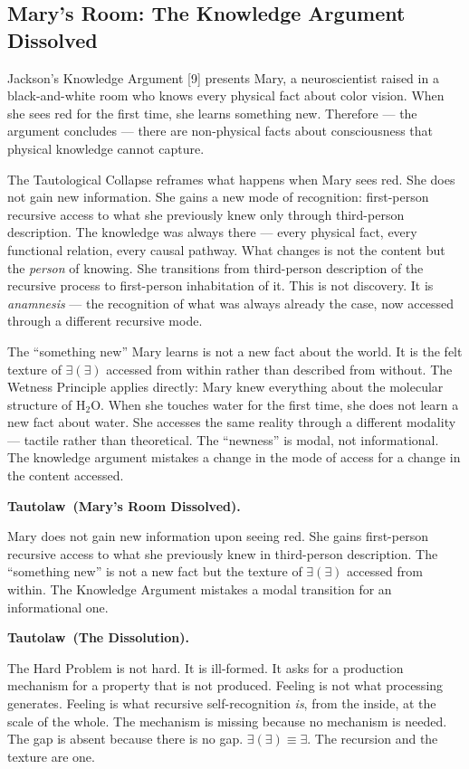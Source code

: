 \documentclass[12pt, letterpaper]{article}
\newenvironment{tautolaw}[1][]{%
    \vspace{0.8em}
    \noindent\textbf{Tautolaw\if\relax\detokenize{#1}\relax\else\ (#1)\fi.}\itshape
}{%
    \upshape\vspace{0.8em}
}
\begin{document}
\subsection*{Mary's Room: The Knowledge Argument Dissolved}

Jackson's Knowledge Argument [9] presents Mary, a neuroscientist raised in a black-and-white room who knows every physical fact about color vision. When she sees red for the first time, she learns something new. Therefore --- the argument concludes --- there are non-physical facts about consciousness that physical knowledge cannot capture.

The Tautological Collapse reframes what happens when Mary sees red. She does not gain new information. She gains a new mode of recognition: first-person recursive access to what she previously knew only through third-person description. The knowledge was always there --- every physical fact, every functional relation, every causal pathway. What changes is not the content but the \emph{person} of knowing. She transitions from third-person description of the recursive process to first-person inhabitation of it. This is not discovery. It is \emph{anamnesis} --- the recognition of what was always already the case, now accessed through a different recursive mode.

The ``something new'' Mary learns is not a new fact about the world. It is the felt texture of $\exists(\exists)$ accessed from within rather than described from without. The Wetness Principle applies directly: Mary knew everything about the molecular structure of H$_2$O. When she touches water for the first time, she does not learn a new fact about water. She accesses the same reality through a different modality --- tactile rather than theoretical. The ``newness'' is modal, not informational. The knowledge argument mistakes a change in the mode of access for a change in the content accessed.

\begin{tautolaw}[Mary's Room Dissolved]
Mary does not gain new information upon seeing red. She gains first-person recursive access to what she previously knew in third-person description. The ``something new'' is not a new fact but the texture of $\exists(\exists)$ accessed from within. The Knowledge Argument mistakes a modal transition for an informational one.
\end{tautolaw}

\begin{tautolaw}[The Dissolution]
The Hard Problem is not hard. It is ill-formed. It asks for a production mechanism for a property that is not produced. Feeling is not what processing generates. Feeling is what recursive self-recognition \emph{is}, from the inside, at the scale of the whole. The mechanism is missing because no mechanism is needed. The gap is absent because there is no gap. $\exists(\exists) \equiv \exists$. The recursion and the texture are one.
\end{tautolaw}
\end{document}
